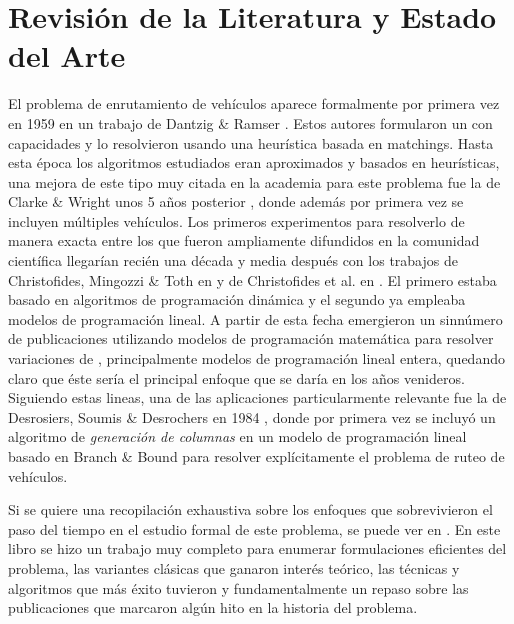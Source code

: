 \section{Revisión de la Literatura y Estado del Arte}

El problema de enrutamiento de vehículos aparece formalmente por primera vez en 1959 en un trabajo de Dantzig \& Ramser \cite{dantzig-ramser}. Estos autores formularon un  con capacidades y lo resolvieron usando una heurística basada en matchings. Hasta esta época los algoritmos estudiados eran aproximados y basados en heurísticas, una mejora de este tipo muy citada en la academia para este problema fue la de Clarke \& Wright unos 5 años posterior \cite{clarke-wright}, donde además por primera vez se incluyen múltiples vehículos. Los primeros experimentos para resolverlo de manera exacta entre los que fueron ampliamente difundidos en la comunidad científica llegarían recién una década y media después con los trabajos de Christofides, Mingozzi \& Toth en \cite{christo-mingozzi-toth} y de Christofides et al. en \cite{christo-et-al}. El primero estaba basado en algoritmos de programación dinámica y el segundo ya empleaba modelos de programación lineal. A partir de esta fecha emergieron un sinnúmero de publicaciones utilizando modelos de programación matemática para resolver variaciones de , principalmente modelos de programación lineal entera, quedando claro que éste sería el principal enfoque que se daría en los años venideros. Siguiendo estas lineas, una de las aplicaciones particularmente relevante fue la de Desrosiers, Soumis \& Desrochers en 1984 \cite{desrosiers-soumis-desrochers}, donde por primera vez se incluyó un algoritmo de \emph{generación de columnas} en un modelo de programación lineal basado en Branch \& Bound para resolver explícitamente el problema de ruteo de vehículos.
  
Si se quiere una recopilación exhaustiva sobre los enfoques que sobrevivieron el paso del tiempo en el estudio formal de este problema, se puede ver en \cite{toth-vigo}. En este libro se hizo un trabajo muy completo para enumerar formulaciones eficientes del problema, las variantes clásicas que ganaron interés teórico, las técnicas y algoritmos que más éxito tuvieron y fundamentalmente un repaso sobre las publicaciones que marcaron algún hito en la historia del problema.

